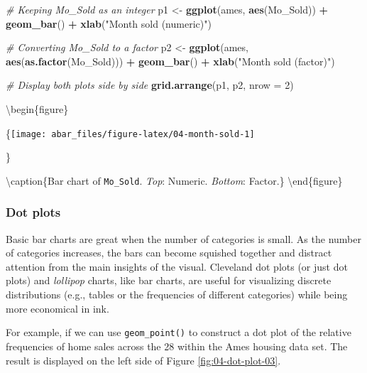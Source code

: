\documentclass[]{book}
\newenvironment{Shaded}{\begin{snugshade}}{\end{snugshade}}
\newcommand{\CommentTok}[1]{\textcolor[rgb]{0.56,0.35,0.01}{\textit{#1}}}
\newcommand{\DataTypeTok}[1]{\textcolor[rgb]{0.13,0.29,0.53}{#1}}
\newcommand{\DecValTok}[1]{\textcolor[rgb]{0.00,0.00,0.81}{#1}}
\newcommand{\KeywordTok}[1]{\textcolor[rgb]{0.13,0.29,0.53}{\textbf{#1}}}
\newcommand{\NormalTok}[1]{#1}
\newcommand{\OperatorTok}[1]{\textcolor[rgb]{0.81,0.36,0.00}{\textbf{#1}}}
\newcommand{\StringTok}[1]{\textcolor[rgb]{0.31,0.60,0.02}{#1}}
\theoremstyle{definition}
\theoremstyle{definition}
\theoremstyle{definition}
\theoremstyle{remark}
\begin{document}
\begin{Shaded}
\begin{Highlighting}[]
\CommentTok{# Keeping Mo_Sold as an integer}
\NormalTok{p1 <-}\StringTok{ }\KeywordTok{ggplot}\NormalTok{(ames, }\KeywordTok{aes}\NormalTok{(Mo_Sold)) }\OperatorTok{+}\StringTok{ }
\StringTok{  }\KeywordTok{geom_bar}\NormalTok{() }\OperatorTok{+}\StringTok{ }
\StringTok{  }\KeywordTok{xlab}\NormalTok{(}\StringTok{"Month sold (numeric)"}\NormalTok{)}

\CommentTok{# Converting Mo_Sold to a factor}
\NormalTok{p2 <-}\StringTok{ }\KeywordTok{ggplot}\NormalTok{(ames, }\KeywordTok{aes}\NormalTok{(}\KeywordTok{as.factor}\NormalTok{(Mo_Sold))) }\OperatorTok{+}\StringTok{ }
\StringTok{  }\KeywordTok{geom_bar}\NormalTok{() }\OperatorTok{+}\StringTok{ }
\StringTok{  }\KeywordTok{xlab}\NormalTok{(}\StringTok{"Month sold (factor)"}\NormalTok{)}

\CommentTok{# Display both plots side by side}
\KeywordTok{grid.arrange}\NormalTok{(p1, p2, }\DataTypeTok{nrow =} \DecValTok{2}\NormalTok{)}
\end{Highlighting}
\end{Shaded}

\textbackslash{}begin\{figure\}

\{\centering \texttt{[image: abar\_files/figure-latex/04-month-sold-1]}

\}

\textbackslash{}caption\{Bar chart of \texttt{Mo\_Sold}. \emph{Top}:
Numeric. \emph{Bottom}: Factor.\}\label{fig:04-month-sold}
\textbackslash{}end\{figure\}

\hypertarget{dot-plots}{%
\subsubsection{Dot plots}\label{dot-plots}}

Basic bar charts are great when the number of categories is small. As
the number of categories increases, the bars can become squished
together and distract attention from the main insights of the visual.
Cleveland dot plots (or just dot plots) and \emph{lollipop} charts, like
bar charts, are useful for visualizing discrete distributions (e.g.,
tables or the frequencies of different categories) while being more
economical in ink.

For example, if we can use \texttt{geom\_point()} to construct a dot
plot of the relative frequencies of home sales across the 28 within the
Ames housing data set. The result is displayed on the left side of
Figure \ref{fig:04-dot-plot-03}.
\end{document}
